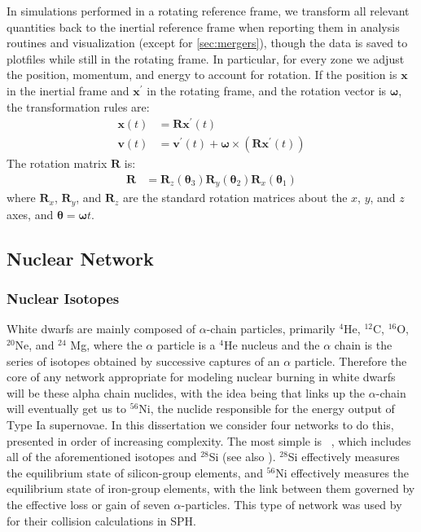 \documentclass[12pt]{article}
\begin{document}
In simulations performed in a rotating reference frame, we transform all relevant
quantities back to the inertial reference frame when reporting them in analysis routines 
and visualization (except for \autoref{sec:mergers}), though the data is saved to plotfiles
while still in the rotating frame. In particular, for every zone we adjust the position,
momentum, and energy to account for rotation. If the position is $\mathbf{x}$ in the inertial
frame and $\mathbf{x}^\prime$ in the rotating frame, and the rotation vector is $\bm{\omega}$,
the transformation rules are:
\begin{align}  
  \mathbf{x}(t) &= \mathbf{R}\mathbf{x}^\prime(t) \\
  \mathbf{v}(t) &= \mathbf{v}^\prime(t) + \bm{\omega} \times \left(\mathbf{R} \mathbf{x}^\prime(t)\right)
\end{align}
The rotation matrix $\mathbf{R}$ is:
\begin{align}
  \mathbf{R} &= \mathbf{R}_z({\bm{\theta}}_3) \mathbf{R}_y({\bm{\theta}}_2) \mathbf{R}_x({\bm{\theta}}_1)
\end{align}
where $\mathbf{R}_x$, $\mathbf{R}_y$, and $\mathbf{R}_z$ are the standard rotation matrices about 
the $x$, $y$, and $z$ axes, and $\bm{\theta} = \bm{\omega} t$.



\subsection{Nuclear Network}
\label{sec:network}

\subsubsection{Nuclear Isotopes}
\label{sec:isotopes}

White dwarfs are mainly composed of $\alpha$-chain particles, primarily ${}^4$He,
${}^{12}$C, ${}^{16}$O, ${}^{20}$Ne, and ${}^{24}$ Mg, where the $\alpha$ particle
is a ${}^4$He nucleus and the $\alpha$ chain is the series of isotopes obtained by
successive captures of an $\alpha$ particle. Therefore the core of
any network appropriate for modeling nuclear burning in white dwarfs will be
these alpha chain nuclides, with the idea being that links up the $\alpha$-chain
will eventually get us to ${}^{56}$Ni, the nuclide responsible for the
energy output of Type Ia supernovae. In this dissertation we consider four networks
to do this, presented in order of increasing complexity. The most simple is
\isoseven\ \citep{timmes:2000}, which includes all of the aforementioned isotopes and
${}^{28}$Si (see also \citet{hix:1998}). ${}^{28}$Si effectively measures the
equilibrium state of silicon-group elements, and ${}^{56}$Ni effectively measures
the equilibrium state of iron-group elements, with the link between them governed
by the effective loss or gain of seven $\alpha$-particles. This type of network
was used by \citet{rosswog:2009} for their collision calculations in SPH.
\end{document}
